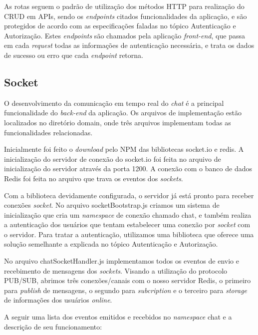 As rotas seguem o padrão de utilização dos métodos HTTP para realização do CRUD em APIs, sendo os \textit{endpoints} citados funcionalidades da aplicação, e são protegidos de acordo com as especificações faladas no tópico Autenticação e Autorização. Estes \textit{endpoints} são chamados pela aplicação \textit{front-end}, que passa em cada \textit{request} todas as informações de autenticação necessária, e trata os dados de sucesso ou erro que cada \textit{endpoint} retorna.

\subsection{Socket}
O desenvolvimento da comunicação em tempo real do \textit{chat} é a principal funcionalidade do \textit{back-end} da aplicação. Os arquivos de implementação estão localizados no diretório domain, onde três arquivos implementam todas as funcionalidades relacionadas.

Inicialmente foi feito o \textit{download} pelo NPM das bibliotecas socket.io e redis. A inicialização do servidor de conexão do socket.io foi feita no arquivo de inicialização do servidor através da porta 1200. A conexão com o banco de dados Redis foi feita no arquivo que trava os eventos dos \textit{sockets}.

Com a biblioteca devidamente configurada, o servidor já está pronto para receber conexões \textit{socket}. No arquivo socketBootstrap.js criamos um sistema de inicialização que cria um \textit{namespace} de conexão chamado chat, e também realiza a autenticação dos usuários que tentam estabelecer uma conexão por \textit{socket} com o servidor. Para tratar a autenticação, utilizamos uma biblioteca \cite{socketio-auth} que oferece uma solução semelhante a explicada no tópico Autenticação e Autorização.

No arquivo chatSocketHandler.js implementamos todos os eventos de envio e recebimento de mensagens dos \textit{sockets}. Visando a utilização do protocolo PUB/SUB, abrimos três conexões/canais com o nosso servidor Redis, o primeiro para \textit{publish} de mensagens, o segundo para \textit{subcription} e o terceiro para \textit{storage} de informações dos usuários \textit{online}.

A seguir uma lista dos eventos emitidos e recebidos no \textit{namespace} chat e a descrição de seu funcionamento:

